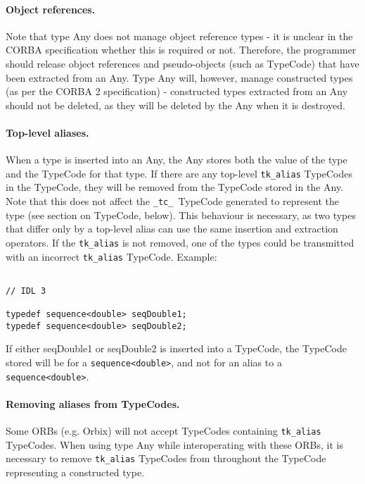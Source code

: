 \documentclass[11pt,twoside,onecolumn]{book}
\begin{document}
\paragraph*{Object references.}
Note that type Any does not manage object reference types - it is unclear in 
the CORBA specification whether this is required or not. Therefore, the 
programmer should release object references and pseudo-objects (such as 
TypeCode) that have been extracted from an Any. Type Any will, however, manage
constructed types (as per the CORBA 2 specification) - constructed types
extracted from an Any should not be deleted, as they will be deleted by the 
Any when it is destroyed.

\paragraph*{Top-level aliases.}
When a type is inserted into an Any, the Any stores both the value of the type
and the TypeCode for that type. If there are any top-level {\tt tk\_alias} 
TypeCodes in the TypeCode, they will be removed from the TypeCode stored in 
the Any. Note that this does not affect the {\tt \_tc\_ }TypeCode generated to 
represent the type (see section on TypeCode, below). This behaviour is 
necessary, as two types that differ only by a top-level alias can use the 
same insertion and extraction operators. If the {\tt tk\_alias} is not 
removed, one of the types could be transmitted with an incorrect 
{\tt tk\_alias} TypeCode. Example:

{\small
\begin{verbatim}

// IDL 3

typedef sequence<double> seqDouble1;
typedef sequence<double> seqDouble2;

\end{verbatim}
}

If either seqDouble1 or seqDouble2 is inserted into a TypeCode, the TypeCode
stored will be for a {\tt sequence<double>}, and not for an alias to a 
{\tt sequence<double>}.

\paragraph*{Removing aliases from TypeCodes.}
Some ORBs (e.g. Orbix) will not accept TypeCodes containing {\tt tk\_alias} 
TypeCodes. When using type Any while interoperating with these ORBs, it is 
necessary to remove {\tt tk\_alias} TypeCodes from throughout the TypeCode 
representing a constructed type. 
\end{document}
